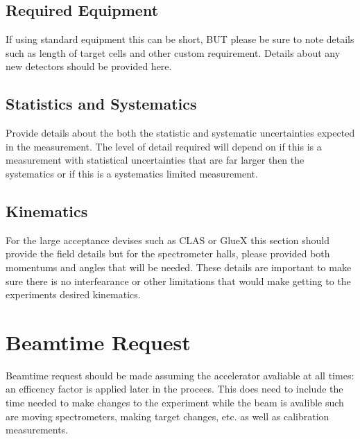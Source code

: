 \documentclass[titlepage,10pt]{article}
\begin{document}
\subsection{Required Equipment}

If using standard equipment this can be short, BUT please be sure to note details such as length of target cells and other custom requirement.   Details about any new detectors should be provided here.

\subsection{Statistics and Systematics}

Provide details about the both the statistic and systematic uncertainties expected in the measurement.    The level of detail required will depend on if this is a measurement with statistical uncertainties that are far larger then the systematics or if this is a systematics limited measurement.

\subsection{Kinematics}

For the large acceptance devises such as CLAS or GlueX this section should provide the field details but for the spectrometer halls, please provided both momentums and angles that will be needed.   These details are important to make sure there is no interfearance or other limitations that would make getting to the experiments desired kinematics.    

\section{Beamtime Request} 

Beamtime request should be made assuming the accelerator avaliable at all times: an efficency factor is applied later in the procees.    This does need to include the time needed to make changes to the experiment while the beam is avalible such are moving spectrometers, making target changes, etc. as well as calibration measurements.
\end{document}
